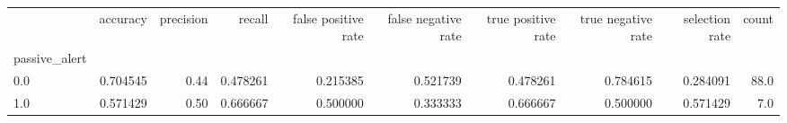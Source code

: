 \begin{tabular}{lrrrrrrrrr}
\toprule
{} &  accuracy &  precision &    recall &  false positive rate &  false negative rate &  true positive rate &  true negative rate &  selection rate &  count \\
passive\_alert &           &            &           &                      &                      &                     &                     &                 &        \\
\midrule
0.0           &  0.704545 &       0.44 &  0.478261 &             0.215385 &             0.521739 &            0.478261 &            0.784615 &        0.284091 &   88.0 \\
1.0           &  0.571429 &       0.50 &  0.666667 &             0.500000 &             0.333333 &            0.666667 &            0.500000 &        0.571429 &    7.0 \\
\bottomrule
\end{tabular}
